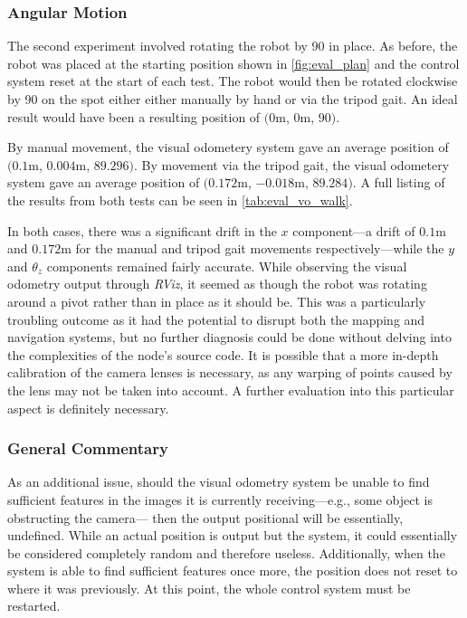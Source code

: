 \subsubsection{Angular Motion}

The second experiment involved rotating the robot by $90$\textdegree{} in place. As before, the robot was placed at the starting position shown in \autoref{fig:eval_plan} and the control system reset at the start of each test. The robot would then be rotated clockwise by 90\textdegree{} on the spot either either manually by hand or via the tripod gait. An ideal result would have been a resulting position of $(0$m, $0$m, $90$\textdegree{}$)$.

By manual movement, the visual odometery system gave an average position of $(0.1$m, $0.004$m, $89.296$\textdegree{}$)$. By movement via the tripod gait, the visual odometery system gave an average position of $(0.172$m, $-0.018$m, $89.284$\textdegree{}$)$. A full listing of the results from both tests can be seen in \autoref{tab:eval_vo_walk}.

In both cases, there was a significant drift in the $x$ component---a drift of $0.1$m and $0.172$m for the manual and tripod gait movements respectively---while the $y$ and $\theta_z$ components remained fairly accurate. While observing the visual odometry output through \emph{RViz}, it seemed as though the robot was rotating around a pivot rather than in place as it should be. This was a particularly troubling outcome as it had the potential to disrupt both the mapping and navigation systems, but no further diagnosis could be done without delving into the complexities of the node's source code. It is possible that a more in-depth calibration of the camera lenses is necessary, as any warping of points caused by the lens may not be taken into account. A further evaluation into this particular aspect is definitely necessary.

\subsubsection{General Commentary}

As an additional issue, should the visual odometry system be unable to find sufficient features in the images it is currently receiving---e.g., some object is obstructing the camera--- then the output positional will be essentially, undefined. While an actual position is output but the system, it could essentially be considered completely random and therefore useless. Additionally, when the system is able to find sufficient features once more, the position does not reset to where it was previously. At this point, the whole control system must be restarted.

